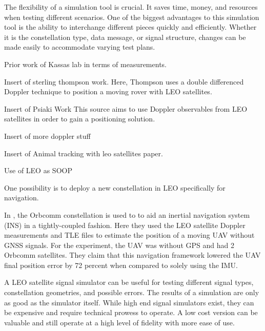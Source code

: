 \documentclass[12pt]{report}
\begin{document}
The flexibility of a simulation tool is crucial. It saves time, money, and resources when testing different scenarios. One of the biggest advantages to this simulation tool is the ability to interchange different pieces quickly and efficiently. Whether it is the constellation type, data message, or signal structure, changes can be made easily to accommodate varying test plans.

Prior work of Kassas lab in terms of measurements. 


Insert of sterling thompson work. Here, Thompson uses a double differenced Doppler technique to position a moving rover with LEO satellites.  \cite{thompsonSingleDifferencedDoppler2021}

Insert of Psiaki Work \cite{psiakiNavigationUsingCarrier2021} This source aims to use Doppler observables from LEO satellites in order to gain a positioning solution. 

Insert of more doppler stuff \cite{hsuAssessmentUsingDoppler2014}

Insert of Animal tracking with leo satellites paper. \cite{lopezImprovingArgosDoppler2014}

Use of LEO as SOOP \cite{khalifeReceiverDesignDoppler2019} \cite{tanNewMethodPositioning2019}

One possibility is to deploy a new constellation in LEO specifically for navigation.  \cite{reidSatelliteNavigationAge2020}


In \cite{moralesInertialNavigationSystem2018}, the Orbcomm constellation is used to to aid an inertial navigation system (INS) in a tightly-coupled fashion. Here they used the LEO satellite Doppler measurements and TLE files to estimate the position of a moving UAV without GNSS signals. For the experiment, the UAV was without GPS and had 2 Orbcomm satellites. They claim that this navigation framework lowered the UAV final position error by 72 percent when compared to solely using the IMU.


A LEO satellite signal simulator can be useful for testing different signal types, constellation geometries, and possible errors. The results of a simulation are only as good as the simulator itself. While high end signal simulators exist, they can be expensive and require technical prowess to operate. A low cost version can be valuable and still operate at a high level of fidelity with more ease of use. 
\end{document}

